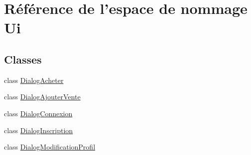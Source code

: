 \hypertarget{namespace_ui}{\section{Référence de l'espace de nommage Ui}
\label{namespace_ui}
}
\subsection*{Classes}
\begin{DoxyCompactItemize}
\item 
class \hyperlink{class_ui_1_1_dialog_acheter}{Dialog\-Acheter}
\item 
class \hyperlink{class_ui_1_1_dialog_ajouter_vente}{Dialog\-Ajouter\-Vente}
\item 
class \hyperlink{class_ui_1_1_dialog_connexion}{Dialog\-Connexion}
\item 
class \hyperlink{class_ui_1_1_dialog_inscription}{Dialog\-Inscription}
\item 
class \hyperlink{class_ui_1_1_dialog_modification_profil}{Dialog\-Modification\-Profil}
\end{DoxyCompactItemize}
